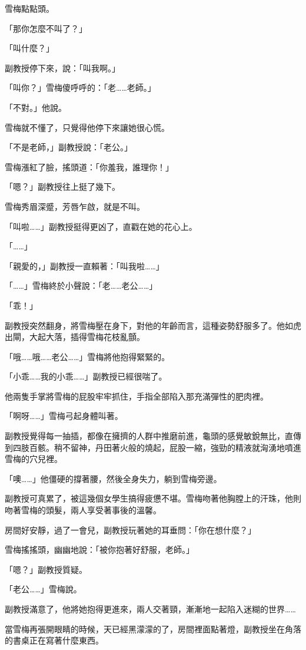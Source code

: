 雪梅點點頭。

「那你怎麼不叫了？」

「叫什麼？」

副教授停下來，說：「叫我啊。」

「叫你？」雪梅傻呼呼的：「老……老師。」

「不對。」他說。

雪梅就不懂了，只覺得他停下來讓她很心慌。

「不是老師，」副教授說：「老公。」

雪梅漲紅了臉，搖頭道：「你羞我，誰理你！」

「嗯？」副教授往上挺了幾下。

雪梅秀眉深蹙，芳唇乍啟，就是不叫。

「叫啦……」副教授挺得更凶了，直戳在她的花心上。

「……」

「親愛的，」副教授一直賴著：「叫我啦……」

「……」雪梅終於小聲說：「老……老公……」

「乖！」

副教授突然翻身，將雪梅壓在身下，對他的年齡而言，這種姿勢舒服多了。他如虎出閘，大起大落，插得雪梅花枝亂顫。

「哦……哦……老公……」雪梅將他抱得緊緊的。

「小乖……我的小乖……」副教授已經很喘了。

他兩隻手掌將雪梅的屁股牢牢抓住，手指全部陷入那充滿彈性的肥肉裡。

「啊呀……」雪梅弓起身體叫著。

副教授覺得每一抽插，都像在擁擠的人群中推磨前進，龜頭的感覺敏銳無比，直傳到四肢百骸。稍不留神，丹田著火般的燒起，屁股一縮，強勁的精液就洶湧地噴進雪梅的穴兒裡。

「噢……」他僵硬的撐著腰，然後全身失力，躺到雪梅旁邊。

副教授可真累了，被這幾個女學生搞得疲憊不堪。雪梅吻著他胸膛上的汗珠，他則吻著雪梅的頭髮，兩人享受著事後的溫馨。

房間好安靜，過了一會兒，副教授玩著她的耳垂問：「你在想什麼？」

雪梅搖搖頭，幽幽地說：「被你抱著好舒服，老師。」

「嗯？」副教授質疑。

「老公……」雪梅說。

副教授滿意了，他將她抱得更進來，兩人交著頸，漸漸地一起陷入迷糊的世界……

當雪梅再張開眼睛的時候，天已經黑濛濛的了，房間裡面點著燈，副教授坐在角落的書桌正在寫著什麼東西。

